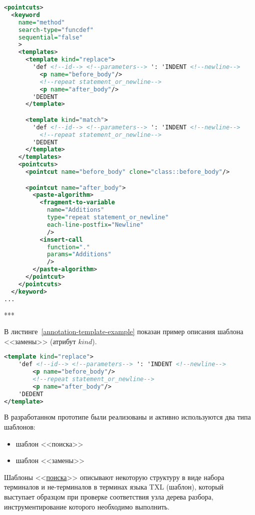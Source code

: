 \begin{lstlisting}[frame=single, language=XML, label={annotation-pointcuts-example}, caption={Пример описания основной информации одной конструкции для языка Python.}]
<pointcuts>
  <keyword
    name="method"
    search-type="funcdef"
    sequential="false"
    >
    <templates>
      <template kind="replace">
        'def <!--id--> <!--parameters--> ': 'INDENT <!--newline-->
          <p name="before_body"/>
          <!--repeat statement_or_newline-->
          <p name="after_body"/>
        'DEDENT
      </template>

      <template kind="match">
        'def <!--id--> <!--parameters--> ': 'INDENT <!--newline-->
          <!--repeat statement_or_newline-->
        'DEDENT
      </template>
    </templates>
    <pointcuts>
      <pointcut name="before_body" clone="class::before_body"/>

      <pointcut name="after_body">
        <paste-algorithm>
          <fragment-to-variable
            name="Additions"
            type="repeat statement_or_newline"
            each-line-postfix="Newline"
            />
          <insert-call
            function="."
            params="Additions"
            />
        </paste-algorithm>
      </pointcut>
    </pointcuts>
  </keyword>
...
\end{lstlisting}

***

В листинге~\ref{annotation-template-example} показан пример описания шаблона <<замены>> (атрибут $kind$).

\begin{lstlisting}[frame=single, language=XML, label={annotation-template-example}, caption={Пример описания шаблона.}]
<template kind="replace">
    'def <!--id--> <!--parameters--> ': 'INDENT <!--newline-->
        <p name="before_body"/>
        <!--repeat statement_or_newline-->
        <p name="after_body"/>
    'DEDENT
</template>
\end{lstlisting}

В разработанном прототипе были реализованы и активно используются два типа шаблонов:
\begin{itemize}[noitemsep]
  \item шаблон <<поиска>>
  \item шаблон <<замены>>
\end{itemize}

Шаблоны <<\underline{поиска}>> описывают некоторую структуру в виде набора терминалов и не-терминалов в терминах языка TXL (шаблон), который выступает образцом при проверке соответствия узла дерева разбора, инструментирование которого необходимо выполнить.


